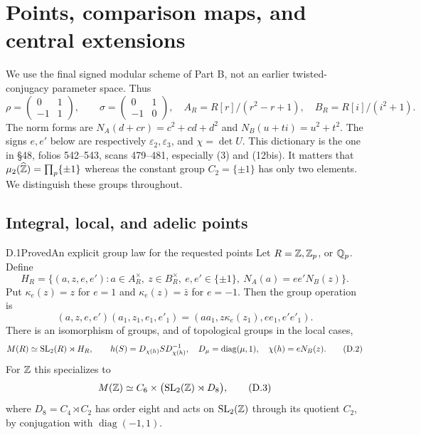 \section{Points, comparison maps, and central extensions}
\label{sec:D}
\providecommand{\C}{\mathbb C}
\providecommand{\PSL}{\operatorname{PSL}}

We use the final signed modular scheme of Part B, not an earlier
twisted-conjugacy parameter space.  Thus
\[
 \rho=\begin{pmatrix}0&1\\-1&1\end{pmatrix},\qquad
 \sigma=\begin{pmatrix}0&1\\-1&0\end{pmatrix},
 \quad A_R=R[r]/(r^2-r+1),\quad B_R=R[i]/(i^2+1).
\]
The norm forms are \(N_A(d+cr)=c^2+cd+d^2\) and
\(N_B(u+ti)=u^2+t^2\).  The signs \(e,e'\) below are respectively
\(\varepsilon _2,\varepsilon _3\), and \(\chi=\det U\).
This dictionary is the one in \S48, folios 542--543,
scans 479--481, especially (3) and (12bis).  It matters that
\(\mu _2(\widehat{\mathbb Z})=\prod_p\{\pm1\}\) whereas the constant group
\(C_2=\{\pm1\}\) has only two elements.  We distinguish these groups
throughout.

\subsection{Integral, local, and adelic points}

\begin{statement}{D.1}{Proved}{An explicit group law for the requested points}
Let \(R=\mathbb Z,\mathbb Z_p\), or \(\mathbb Q_p\).  Define
\[
 H_R=\{(a,z,e,e'):a\in A_R^\times,\ z\in B_R^\times,\
 e,e'\in\{\pm1\},\ N_A(a)=ee'N_B(z)\}.
\]
Put \(\kappa_e(z)=z\) for \(e=1\) and \(\kappa_e(z)=\bar z\)
for \(e=-1\).  Then the group operation is
\[
 (a,z,e,e')(a_1,z_1,e_1,e'_1)
 =(aa_1,z\kappa_e(z_1),ee_1,e'e'_1).
 \tag{D.1}
\]
There is an isomorphism of groups, and of topological groups in the
local cases,
\[
 M(R)\simeq \operatorname{SL}_2(R)\rtimes H_R, \qquad
 h(S)=D_{\chi(h)}S D_{\chi(h)}^{-1},\quad
 D_\mu=\operatorname{diag}(\mu,1),\quad
 \chi(h)=eN_B(z).
 \tag{D.2}
\]
For \(\mathbb Z\) this specializes to
\[
 M(\mathbb Z)\simeq C_6\times\bigl(\operatorname{SL}_2(\mathbb Z)\rtimes D_8\bigr),
 \tag{D.3}
\]
where \(D_8=C_4\rtimes C_2\) has order eight and acts on
\(\operatorname{SL}_2(\mathbb Z)\) through its quotient \(C_2\), by conjugation with
\(\operatorname{diag}(-1,1)\).
\end{statement}

